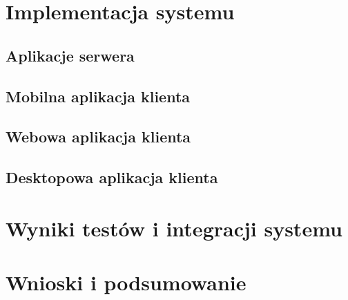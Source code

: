 \documentclass[11pt, a4paper]{article}
\begin{document}
\newpage

\section{Implementacja systemu}

\subsection{Aplikacje serwera}

\subsection{Mobilna aplikacja klienta}

\subsection{Webowa aplikacja klienta}

\subsection{Desktopowa aplikacja klienta}
\newpage
\section{Wyniki testów i integracji systemu}

\newpage

\section{Wnioski i podsumowanie}


\newpage

\printbibliography[heading=bibintoc]
\end{document}
